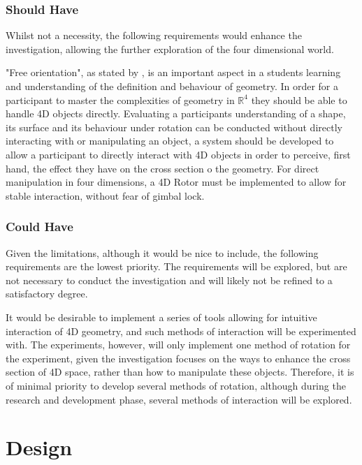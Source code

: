 \documentclass{l4proj}
\begin{document}
\subsection*{Should Have}

Whilst not a necessity, the following requirements would enhance the investigation, allowing the further exploration of the four dimensional world.

"Free orientation", as stated by \citet{safrankova_van_2012}, is an important aspect in a students learning and understanding of the definition and behaviour of geometry. In order for a participant to master the complexities of geometry in $\mathbb{R}^4$ they should be able to handle 4D objects directly.
Evaluating a participants understanding of a shape, its surface and its behaviour under rotation can be conducted without directly interacting with or manipulating an object, a system should be developed to allow a participant to directly interact with 4D objects in order to perceive, first hand, the effect they have on the cross section o the geometry.
For direct manipulation in four dimensions, a 4D Rotor must be implemented to allow for stable interaction, without fear of gimbal lock.
\pagebreak
\subsection*{Could Have}

Given the limitations, although it would be nice to include, the following requirements are the lowest priority. The requirements will be explored, but are not necessary to conduct the investigation and will likely not be refined to a satisfactory degree.

It would be desirable to implement a series of tools allowing for intuitive interaction of 4D geometry, and such methods of interaction will be experimented with. The experiments, however, will only implement one method of rotation for the experiment, given the investigation focuses on the ways to enhance the cross section of 4D space, rather than how to manipulate these objects. Therefore, it is of minimal priority to develop several methods of rotation, although during the research and development phase, several methods of interaction will be explored.

\chapter{Design}
\end{document}

